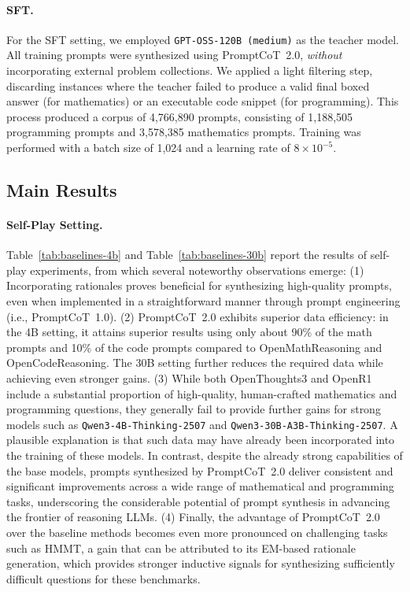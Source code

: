   \paragraph{SFT.}
  For the SFT setting, we employed \texttt{GPT-OSS-120B (medium)} as the teacher model. 
  All training prompts were synthesized using PromptCoT~2.0, \textit{without} incorporating external problem collections. 
  We applied a light filtering step, discarding instances where the teacher failed to produce a valid final boxed answer (for mathematics) or an executable code snippet (for programming). 
  This process produced a corpus of 4,766,890 prompts, consisting of 1,188,505 programming prompts and 3,578,385 mathematics prompts. 
  Training was performed with a batch size of 1,024 and a learning rate of $8 \times 10^{-5}$.
  
  
  
  
  \subsection{Main Results}
  \paragraph{Self-Play Setting.}
  Table~\ref{tab:baselines-4b} and Table~\ref{tab:baselines-30b} report the results of self-play experiments, from which several noteworthy observations emerge: (1) Incorporating rationales proves beneficial for synthesizing high-quality prompts, even when implemented in a straightforward manner through prompt engineering (i.e., PromptCoT~1.0). 
  (2) PromptCoT~2.0 exhibits superior data efficiency: in the 4B setting, it attains superior results using only about 90\% of the math prompts and 10\% of the code prompts compared to OpenMathReasoning and OpenCodeReasoning. The 30B setting further reduces the required data while achieving even stronger gains.
  (3) While both OpenThoughts3 and OpenR1 include a substantial proportion of high-quality, human-crafted mathematics and programming questions, they generally fail to provide further gains for strong models such as \texttt{Qwen3-4B-Thinking-2507} and \texttt{Qwen3-30B-A3B-Thinking-2507}. A plausible explanation is that such data may have already been incorporated into the training of these models. In contrast, despite the already strong capabilities of the base models, prompts synthesized by PromptCoT~2.0 deliver consistent and significant improvements across a wide range of mathematical and programming tasks, underscoring the considerable potential of prompt synthesis in advancing the frontier of reasoning LLMs. (4) Finally, the advantage of PromptCoT~2.0 over the baseline methods becomes even more pronounced on challenging tasks such as HMMT, a gain that can be attributed to its EM-based rationale generation, which provides stronger inductive signals for synthesizing sufficiently difficult questions for these benchmarks.
  
